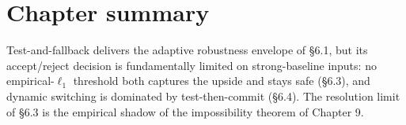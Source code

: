 \section{Chapter summary}\label{chapter-summary}

Test-and-fallback delivers the adaptive robustness envelope of §6.1, but its accept/reject
decision is fundamentally limited on strong-baseline inputs: no empirical-\(\ell_1\) threshold
both captures the upside and stays safe (§6.3), and dynamic switching is dominated by
test-then-commit (§6.4). The resolution limit of §6.3 is the empirical shadow of the
impossibility theorem of Chapter 9.
